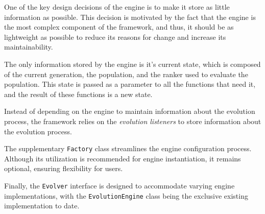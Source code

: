     One of the key design decisions of the engine is to make it store as little
    information as possible.
    This decision is motivated by the fact that the engine is the most complex
    component of the framework, and thus, it should be as lightweight as possible
    to reduce its reasons for change and increase its maintainability.

    The only information stored by the engine is it's current state, which is
    composed of the current generation, the population, and the ranker used to
    evaluate the population.
    This state is passed as a parameter to all the functions that need it, and
    the result of these functions is a new state.

    Instead of depending on the engine to maintain information about the evolution
    process, the framework relies on the \emph{evolution listeners} to store
    information about the evolution process.

    The supplementary \texttt{Factory} class streamlines the engine configuration 
    process.
    Although its utilization is recommended for engine instantiation, it remains 
    optional, ensuring flexibility for users.

    Finally, the \texttt{Evolver} interface is designed to accommodate varying 
    engine implementations, with the \texttt{EvolutionEngine} class being the 
    exclusive existing implementation to date.
